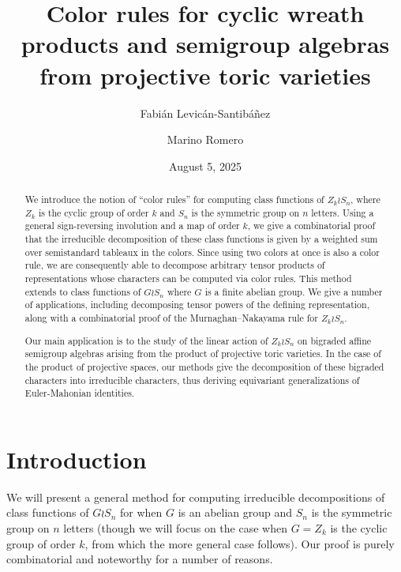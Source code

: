 \documentclass[a4paper,12pt]{amsart}
\theoremstyle{plain}
\theoremstyle{definition}
\theoremstyle{remark}
\begin{document}
\title[Color rules for cyclic wreath products and semigroup algebras]{Color rules for cyclic wreath products and semigroup algebras from projective toric varieties}
\author{Fabián Levicán-Santibáñez}
\author{Marino Romero}
\address{Fakultät für Mathematik, Universität Wien, Austria}
\date{August 5, 2025}

\begin{abstract}
We introduce the notion of ``color rules'' for computing class functions of $Z_k \wr S_n$, where $Z_k$ is the cyclic group of order $k$ and $S_n$ is the symmetric group on $n$ letters.  
Using a general sign-reversing involution and a map of order $k$, we give a combinatorial proof that the irreducible decomposition of these class functions is given by a weighted sum over semistandard tableaux in the colors.
Since using two colors at once is also a color rule, we are consequently able to decompose arbitrary tensor products of representations whose characters can be computed via color rules. This method extends to class functions of $G\wr S_n$ where $G$ is a finite abelian group. 
We give a number of applications, including decomposing tensor powers of the defining representation, along with a combinatorial proof of the Murnaghan--Nakayama rule for $Z_k \wr S_n$.

Our main application is to the study of the linear action of $Z_k \wr S_n$ on bigraded affine semigroup algebras arising from the product of projective toric varieties.
In the case of the product of projective spaces, our methods give the decomposition of these bigraded characters into irreducible characters, thus deriving equivariant generalizations of Euler-Mahonian identities.
\end{abstract}

\maketitle

\tableofcontents

\section{Introduction}

We will present a general method for computing irreducible decompositions of class functions of $G \wr S_n$ for when $G$ is an abelian group and $S_n$ is the symmetric group on $n$ letters (though we will focus on the case when $G = Z_k$ is the cyclic group of order $k$, from which the more general case follows). Our proof is purely combinatorial and noteworthy for a number of reasons. \\
\end{document}
